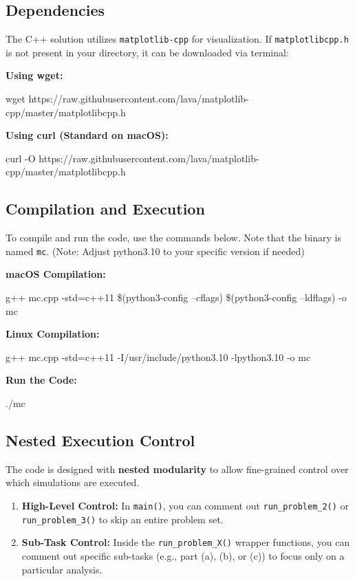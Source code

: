 \documentclass{article}
\begin{document}
\subsection{Dependencies}
The C++ solution utilizes \texttt{matplotlib-cpp} for visualization. If \texttt{matplotlibcpp.h} is not present in your directory, it can be downloaded via terminal:

\textbf{Using wget:}
\begin{shellbox}
wget https://raw.githubusercontent.com/lava/matplotlib-cpp/master/matplotlibcpp.h
\end{shellbox}

\textbf{Using curl (Standard on macOS):}
\begin{shellbox}
curl -O https://raw.githubusercontent.com/lava/matplotlib-cpp/master/matplotlibcpp.h
\end{shellbox}

\subsection{Compilation and Execution}
To compile and run the code, use the commands below. Note that the binary is named \texttt{mc}. (Note: Adjust python3.10 to your specific version if needed)

\textbf{macOS Compilation:}
\begin{shellbox}
g++ mc.cpp -std=c++11 \$(python3-config --cflags) \$(python3-config --ldflags) -o mc
\end{shellbox}

\textbf{Linux Compilation:}
\begin{shellbox}
g++ mc.cpp -std=c++11 -I/usr/include/python3.10 -lpython3.10 -o mc
\end{shellbox}

\textbf{Run the Code:}
\begin{shellbox}
./mc
\end{shellbox}

\subsection{Nested Execution Control}
The code is designed with \textbf{nested modularity} to allow fine-grained control over which simulations are executed. 

\begin{enumerate}
    \item \textbf{High-Level Control:} In \texttt{main()}, you can comment out \texttt{run\_problem\_2()} or \texttt{run\_problem\_3()} to skip an entire problem set.
    \item \textbf{Sub-Task Control:} Inside the \texttt{run\_problem\_X()} wrapper functions, you can comment out specific sub-tasks (e.g., part (a), (b), or (c)) to focus only on a particular analysis.
\end{enumerate}
\end{document}

